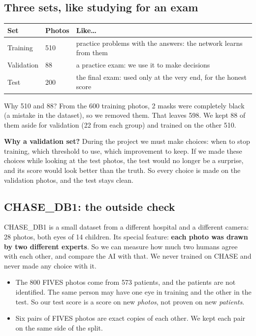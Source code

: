 \documentclass[11pt,a4paper]{article}
\begin{document}
\subsection{Three sets, like studying for an exam}
\begin{center}
\begin{tabular}{@{}lll@{}}
\toprule
\textbf{Set} & \textbf{Photos} & \textbf{Like\ldots} \\
\midrule
Training   & 510 & practice problems with the answers: the network learns from them \\
Validation & 88  & a practice exam: we use it to make decisions \\
Test       & 200 & the final exam: used only at the very end, for the honest score \\
\bottomrule
\end{tabular}
\end{center}

Why 510 and 88? From the 600 training photos, 2 masks were completely black (a mistake in the dataset), so we removed them. That leaves 598. We kept 88 of them aside for validation (22 from each group) and trained on the other 510.

\textbf{Why a validation set?} During the project we must make choices: when to stop training, which threshold to use, which improvement to keep. If we made these choices while looking at the test photos, the test would no longer be a surprise, and its score would look better than the truth. So every choice is made on the validation photos, and the test stays clean.

\subsection{CHASE\_DB1: the outside check}
CHASE\_DB1 is a small dataset from a different hospital and a different camera: 28 photos, both eyes of 14 children. Its special feature: \textbf{each photo was drawn by two different experts}. So we can measure how much two humans agree with each other, and compare the AI with that. We never trained on CHASE and never made any choice with it.

\begin{honest}
\begin{itemize}
  \item The 800 FIVES photos come from 573 patients, and the patients are not identified. The same person may have one eye in training and the other in the test. So our test score is a score on new \emph{photos}, not proven on new \emph{patients}.
  \item Six pairs of FIVES photos are exact copies of each other. We kept each pair on the same side of the split.
\end{itemize}
\end{honest}
\end{document}
